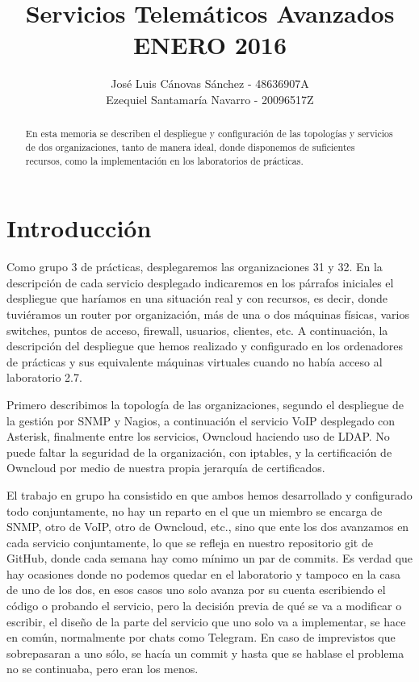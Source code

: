 \documentclass[]{article}
\title{Servicios Telemáticos Avanzados\\ENERO 2016}
\author{José Luis Cánovas Sánchez - 48636907A\\Ezequiel Santamaría Navarro - 20096517Z}
\begin{document}
\maketitle

\begin{abstract}
En esta memoria se describen el despliegue y configuración de las topologías y servicios de dos organizaciones, tanto de manera ideal, donde disponemos de suficientes recursos, como la implementación en los laboratorios de prácticas.
\end{abstract}

\tableofcontents


\section{Introducción}

Como grupo 3 de prácticas, desplegaremos las organizaciones 31 y 32. En la descripción de cada servicio desplegado indicaremos en los párrafos iniciales el despliegue que haríamos en una situación real y con recursos, es decir, donde tuviéramos un router por organización, más de una o dos máquinas físicas, varios switches, puntos de acceso, firewall, usuarios, clientes, etc. A continuación, la descripción del despliegue que hemos realizado y configurado en los ordenadores de prácticas y sus equivalente máquinas virtuales cuando no había acceso al laboratorio 2.7.

Primero describimos la topología de las organizaciones, segundo el despliegue de la gestión por SNMP y Nagios, a continuación el servicio VoIP desplegado con Asterisk, finalmente entre los servicios, Owncloud haciendo uso de LDAP. No puede faltar la seguridad de la organización, con iptables, y la certificación de Owncloud por medio de nuestra propia jerarquía de certificados.

El trabajo en grupo ha consistido en que ambos hemos desarrollado y configurado todo conjuntamente, no hay un reparto en el que un miembro se encarga de SNMP, otro de VoIP, otro de Owncloud, etc., sino que ente los dos avanzamos en cada servicio conjuntamente, lo que se refleja en nuestro repositorio git de GitHub, donde cada semana hay como mínimo un par de commits. Es verdad que hay ocasiones donde no podemos quedar en el laboratorio y tampoco en la casa de uno de los dos, en esos casos uno solo avanza por su cuenta escribiendo el código o probando el servicio, pero la decisión previa de qué se va a modificar o escribir, el diseño de la parte del servicio que uno solo va a implementar, se hace en común, normalmente por chats como Telegram. En caso de imprevistos que sobrepasaran a uno sólo, se hacía un commit y hasta que se hablase el problema no se continuaba, pero eran los menos.
\end{document}
